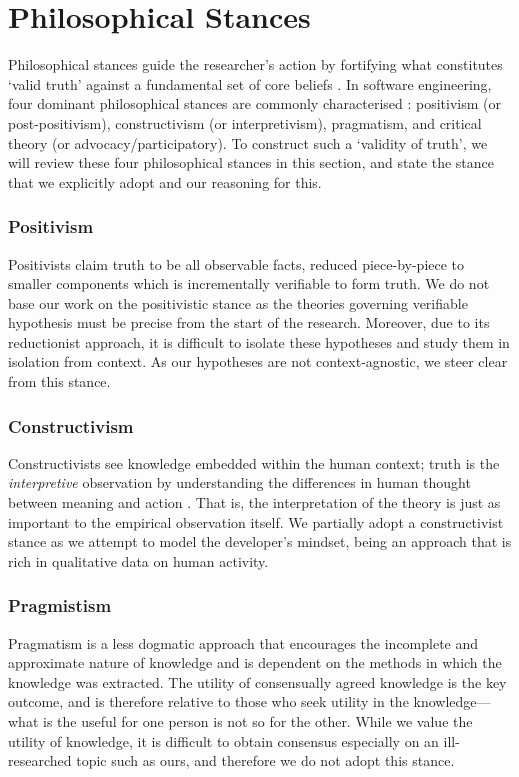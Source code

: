 \section{Philosophical Stances}
\label{sec:research-methodology:philosophical-stances}

Philosophical stances guide the researcher's action by fortifying what constitutes `valid truth' against a fundamental set of core beliefs \citep{Ritzer:1991ge}. In software engineering, four dominant philosophical stances are commonly characterised \citep{Creswell:2017vn,Petersen:2019ji}: positivism (or post-positivism), constructivism (or interpretivism), pragmatism, and critical theory (or advocacy/participatory). To construct such a `validity of truth', we will review these four philosophical stances in this section, and state the stance that we explicitly adopt and our reasoning for this.

\subsubsection*{Positivism}
Positivists claim truth to be all observable facts, reduced piece-by-piece to smaller components which is incrementally verifiable to form truth. We do not base our work on the positivistic stance as the theories governing verifiable hypothesis must be precise from the start of the research. Moreover, due to its reductionist approach, it is difficult to isolate these hypotheses and study them in isolation from context.
As our hypotheses are not context-agnostic, we steer clear from this stance.

\subsubsection*{Constructivism}
Constructivists see knowledge embedded within the human context; truth is the \textit{interpretive} observation by understanding the differences in human thought between meaning and action \citep{Klein:1999uv}. That is, the interpretation of the theory is just as important to the empirical observation itself.
We partially adopt a constructivist stance as we attempt to model the developer's mindset, being an approach that is rich in qualitative data on human activity.

\subsubsection*{Pragmistism}
Pragmatism is a less dogmatic approach that encourages the incomplete and approximate nature of knowledge and is dependent on the methods in which the knowledge was extracted. The utility of consensually agreed knowledge is the key outcome, and is therefore relative to those who seek utility in the knowledge---what is the useful for one person is not so for the other. While we value the utility of knowledge, it is difficult to obtain consensus especially on an ill-researched topic such as ours, and therefore we do not adopt this stance.

